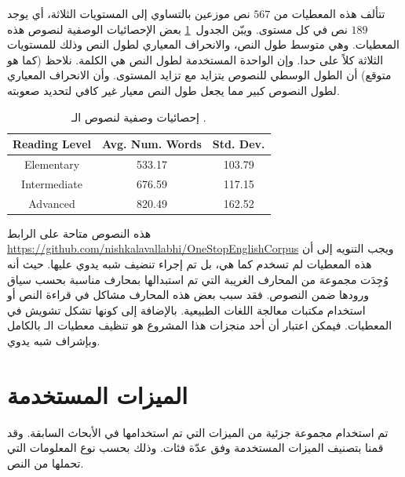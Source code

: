 تتألف هذه المعطيات من $567$ نص موزعين بالتساوي إلى المستويات الثلاثة،
أي يوجد $189$ نص في كل مستوى.
ويبّن الجدول~\ref{tbl:corpus:ose_stat} بعض الإحصائيات الوصفية لنصوص هذه المعطيات.
وهي متوسط طول النص، والانحراف المعياري لطول النص وذلك للمستويات الثلاثة كلاً على حدا.
وإن الواحدة المستخدمة لطول النص هي الكلمة.
نلاحظ (كما هو متوقع) أن الطول الوسطي للنصوص يتزايد مع تزايد المستوى.
وأن الانحراف المعياري لطول النصوص كبير مما يجعل طول النص معيار غير كافي لتحديد صعوبته.

\begin{table}[htb]
	\centering
	{
		\setlength{\tabcolsep}{0.5em} %
		\renewcommand{\arraystretch}{1.4}%
		
		\begin{tabular}{|c|c|c|}
			\hline
			
			\textbf{Reading Level} &
			\textbf{Avg. Num. Words} &
			\textbf{Std. Dev.}\\
			\hline 
			
			Elementary &
			533.17 &
			103.79 \\
			\hline
			
			Intermediate &
			676.59 &
			117.15 \\
			\hline
			
			Advanced &
			820.49 &
			162.52 \\
			\hline
			
		\end{tabular}
	}
	\caption{%
		إحصائيات وصفية لنصوص الـ .
	}
	\label{tbl:corpus:ose_stat}
\end{table}

هذه النصوص متاحة على الرابط
\url{https://github.com/nishkalavallabhi/OneStopEnglishCorpus}
ويجب التنويه إلى أن هذه المعطيات لم تسخدم كما هي، بل تم إجراء تنضيف شبه يدوي عليها.
حيث أنه وُجِدَت مجموعة من المحارف الغريبة التي تم استبدالها بمحارف مناسبة بحسب سياق ورودها ضمن النصوص.
فقد سبب بعض هذه المحارف مشاكل في قراءة النص أو استخدام مكتبات معالجة اللغات الطبيعية.
بالإضافة إلى كونها تشكل تشويش في المعطيات.
فيمكن اعتبار أن أحد منجزات هذا المشروع هو تنظيف معطيات الـ  بالكامل وبإشراف شبه يدوي.





\section{الميزات المستخدمة}
\label{sec:sys:features}
تم استخدام مجموعة جزئية من الميزات التي تم استخدامها في الأبحاث السابقة.
وقد قمنا بتصنيف الميزات المستخدمة وفق عدّة فئات.
وذلك بحسب نوع المعلومات التي تحملها من النص.


